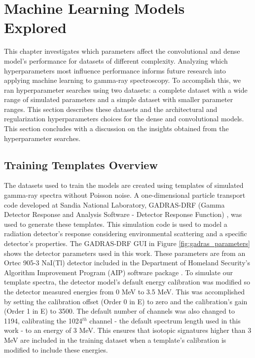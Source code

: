 \chapter{Machine Learning Models Explored} \label{ChapterMachineLearningModelsExplored}

This chapter investigates which parameters affect the convolutional and dense model's performance for datasets of different complexity. Analyzing which hyperparameters most influence performance informs future research into applying machine learning to gamma-ray spectroscopy. To accomplish this, we ran hyperparameter searches using two datasets: a complete dataset with a wide range of simulated parameters and a simple dataset with smaller parameter ranges. This section describes these datasets and the architectural and regularization hyperparameters choices for the dense and convolutional models. This section concludes with a discussion on the insights obtained from the hyperparameter searches.



\section{Training Templates Overview}

The datasets used to train the models are created using templates of simulated gamma-ray spectra without Poisson noise. A one-dimensional particle transport code developed at Sandia National Laboratory, GADRAS-DRF (Gamma Detector Response and Analysis Software - Detector Response Function) \cite{mitchell2014}, was used to generate these templates. This simulation code is used to model a radiation detector's response considering environmental scattering and a specific  detector's properties. The GADRAS-DRF GUI in Figure \ref{fig:gadras_parameters} shows the detector parameters used in this work. These parameters are from an Ortec 905-3 NaI(Tl) detector included in the Department of Homeland Security's Algorithm Improvement Program (AIP) software package \cite{DHSAIP}. To simulate our template spectra, the detector model's default energy calibration was modified so the detector measured energies from 0 MeV to 3.5 MeV. This was accomplished by setting the calibration offset (Order 0 in E) to zero and the calibration's gain (Order 1 in E) to 3500. The default number of channels was also changed to 1194, calibrating the 1024$^{th}$ channel - the default spectrum length used in this work - to an energy of 3 MeV. This ensures that isotopic signatures higher than 3 MeV are included in the training dataset when a template's calibration is modified to include these energies.

